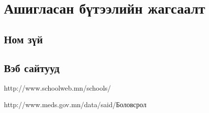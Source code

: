 \documentclass[
oneside, %
english, %
onehalfspacing, %
nolistspacing, %
headsepline, %
]{article} %
\begin{document}
     
     \section{Ашигласан бүтээлийн жагсаалт}
     \subsection{Ном зүй}
     \subsection{Вэб сайтууд}
     http://www.schoolweb.mn/schools/
     
     http://www.meds.gov.mn/data/said/Боловсрол%
     
\end{document}
